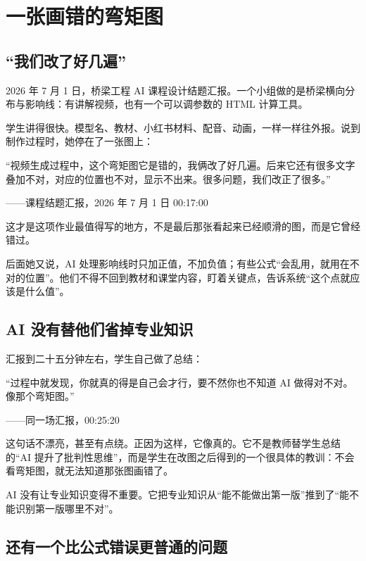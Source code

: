 \chapter{一张画错的弯矩图}

\section{“我们改了好几遍”}

2026 年 7 月 1 日，桥梁工程 AI 课程设计结题汇报。一个小组做的是桥梁横向分布与影响线：有讲解视频，也有一个可以调参数的 HTML 计算工具。

学生讲得很快。模型名、教材、小红书材料、配音、动画，一样一样往外报。说到制作过程时，她停在了一张图上：

\begin{shiyu-inline}
``视频生成过程中，这个弯矩图它是错的，我俩改了好几遍。后来它还有很多文字叠加不对，对应的位置也不对，显示不出来。很多问题，我们改正了很多。''

\hfill ——课程结题汇报，2026 年 7 月 1 日 00:17:00
\end{shiyu-inline}

这才是这项作业最值得写的地方，不是最后那张看起来已经顺滑的图，而是它曾经错过。

后面她又说，AI 处理影响线时只加正值，不加负值；有些公式“会乱用，就用在不对的位置”。他们不得不回到教材和课堂内容，盯着关键点，告诉系统“这个点就应该是什么值”。

\section{AI 没有替他们省掉专业知识}

汇报到二十五分钟左右，学生自己做了总结：

\begin{shiyu-inline}
``过程中就发现，你就真的得是自己会才行，要不然你也不知道 AI 做得对不对。像那个弯矩图。''

\hfill ——同一场汇报，00:25:20
\end{shiyu-inline}

这句话不漂亮，甚至有点绕。正因为这样，它像真的。它不是教师替学生总结的“AI 提升了批判性思维”，而是学生在改图之后得到的一个很具体的教训：不会看弯矩图，就无法知道那张图画错了。

AI 没有让专业知识变得不重要。它把专业知识从“能不能做出第一版”推到了“能不能识别第一版哪里不对”。

\section{还有一个比公式错误更普通的问题}

